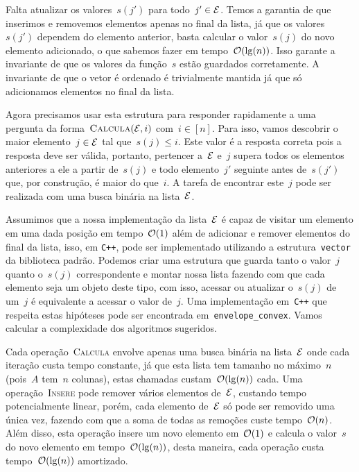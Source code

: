 Falta atualizar os valores~$s(j')$ para todo~$j' \in \mathcal{E}$. Temos a garantia de que inserimos e removemos elementos apenas no final da lista, já que os valores~$s(j')$ dependem do elemento anterior, basta calcular o valor~$s(j)$ do novo elemento adicionado, o que sabemos fazer em tempo~$\mathcal{O}(\lg(n))$. Isso garante a invariante de que os valores da função~$s$ estão guardados corretamente. A invariante de que o vetor é ordenado é trivialmente mantida já que só adicionamos elementos no final da lista.

Agora precisamos usar esta estrutura para responder rapidamente a uma pergunta da forma~${ \textsc{Calcula}(\mathcal{E},i) }$ com~$i \in [n]$. Para isso, vamos descobrir o maior elemento~$j \in \mathcal{E}$ tal que~$s(j) \leq i$. Este valor é a resposta correta pois a resposta deve ser válida, portanto, pertencer a~$\mathcal{E}$ e~$j$ supera todos os elementos anteriores a ele a partir de~$s(j)$ e todo elemento~$j'$ seguinte antes de~$s(j')$ que, por construção, é maior do que~$i$. A tarefa de encontrar este~$j$ pode ser realizada com uma busca binária na lista~$\mathcal{E}$.

Assumimos que a nossa implementação da lista~$\mathcal{E}$ é capaz de visitar um elemento em uma dada posição em tempo~$\mathcal{O}(1)$ além de adicionar e remover elementos do final da lista, isso, em \texttt{C++}, pode ser implementado utilizando a estrutura~\texttt{vector} da biblioteca padrão. Podemos criar uma estrutura que guarda tanto o valor~$j$ quanto o~$s(j)$ correspondente e montar nossa lista fazendo com que cada elemento seja um objeto deste tipo, com isso, acessar ou atualizar o~$s(j)$ de um~$j$ é equivalente a acessar o valor de~$j$. Uma implementação em~\texttt{C++} que respeita estas hipóteses pode ser encontrada em~\texttt{envelope\_convex}. Vamos calcular a complexidade dos algoritmos sugeridos.

Cada operação~\textsc{Calcula} envolve apenas uma busca binária na lista~$\mathcal{E}$ onde cada iteração custa tempo constante, já que esta lista tem tamanho no máximo~$n$ (pois~$A$ tem~$n$ colunas), estas chamadas custam~$\mathcal{O}(\lg(n))$ cada. Uma operação~\textsc{Insere} pode remover vários elementos de~$\mathcal{E}$, custando tempo potencialmente linear, porém, cada elemento de~$\mathcal{E}$ só pode ser removido uma única vez, fazendo com que a soma de todas as remoções custe tempo~$\mathcal{O}(n)$. Além disso, esta operação insere um novo elemento em~$\mathcal{O}(1)$ e calcula o valor~$s$ do novo elemento em tempo~$\mathcal{O}(\lg(n))$, desta maneira, cada operação custa tempo~$\mathcal{O}(\lg(n))$ amortizado.

